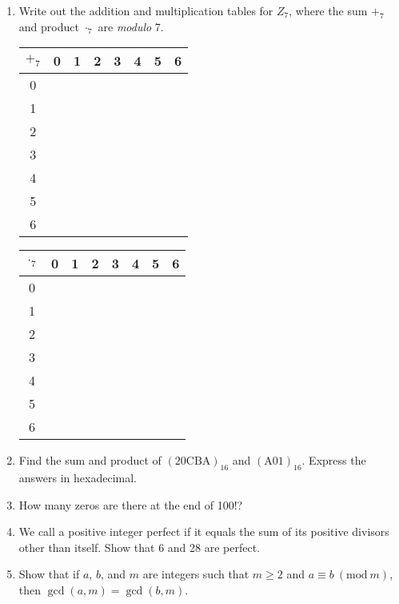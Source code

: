 \documentclass[11pt]{article}
\newcommand{\PMod}[1]{\ (\mathrm{mod}\ #1)}
\begin{document}
\begin{enumerate}
    \item Write out the addition and multiplication tables for $Z_7$, where the sum $+_7$ and product $\cdot_7$ are \textit{modulo} 7.
\begin{multicols}{2}
    \begin{table}[H]
        \begin{tabular}{c|c c c c c c c}
             $+_7$ & 0 & 1 & 2 & 3 & 4 & 5 & 6\\
             \hline
             0 & & & & & & & \\
             1 & & & & & & & \\
             2 & & & & & & & \\
             3 & & & & & & & \\
             4 & & & & & & & \\
             5 & & & & & & & \\
             6 & & & & & & & 
        \end{tabular}
    \end{table}
    
    \begin{table}[H]
        \begin{tabular}{c|c c c c c c c}
             $\cdot_7$ & 0 & 1 & 2 & 3 & 4 & 5 & 6\\
             \hline
             0 & & & & & & & \\
             1 & & & & & & & \\
             2 & & & & & & & \\
             3 & & & & & & & \\
             4 & & & & & & & \\
             5 & & & & & & & \\
             6 & & & & & & &
        \end{tabular}
    \end{table}
\end{multicols}
    \item Find the sum and product of $(20\mathrm{CBA})_{16}$ and $(\mathrm{A}01)_{16}$. Express the answers in hexadecimal.
    \item How many zeros are there at the end of 100!?
    \item We call a positive integer perfect if it equals the sum of its positive divisors other than itself. Show that 6 and 28 are perfect.
    \item Show that if $a$, $b$, and $m$ are integers such that $m \geq 2$ and $a \equiv b \PMod{m}$, then $\gcd(a,m) = \gcd(b,m)$.
\end{enumerate}
\end{document}
